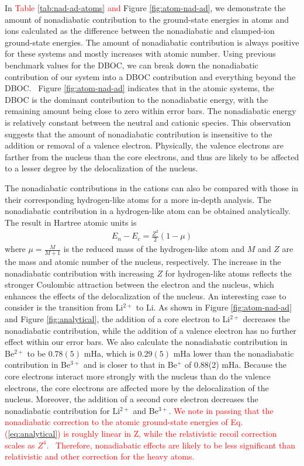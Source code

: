 \documentclass[aip,jcp,numerical,reprint]{revtex4-1}
\begin{document}
In \textcolor{red}{Table \ref{tab:nad-ad-atoms} and} Figure \ref{fig:atom-nad-ad}, we demonstrate the amount of nonadiabatic contribution to the ground-state energies in atoms and ions calculated as the difference between the nonadiabatic and clamped-ion ground-state energies. The amount of nonadiabatic contribution is always positive for these systems and mostly increases with atomic number. Using previous benchmark values for the DBOC, we can break down the nonadiabatic contribution of our system into a DBOC contribution and everything beyond the DBOC.~\cite{Klopper_DBOC,CFOUR,Harding} Figure \ref{fig:atom-nad-ad} indicates that in the atomic systems, the DBOC is the dominant contribution to the nonadiabatic energy, with the remaining amount being close to zero within error bars. The nonadiabatic energy is relatively constant between the neutral and cationic species. This observation suggests that the amount of nonadiabatic contribution is insensitive to the addition or removal of a valence electron. Physically, the valence electrons are farther from the nucleus than the core electrons, and thus are likely to be affected to a lesser degree by the delocalization of the nucleus. 

The nonadiabatic contributions in the cations can also be compared with those in their corresponding hydrogen-like atoms for a more in-depth analysis. The nonadiabatic contribution in a hydrogen-like atom can be obtained analytically. The result in Hartree atomic units is
\begin{align}
E_n-E_c=\frac{Z^2}{2}(1-\mu) \label{eq:analytical}
\end{align}
where $\mu=\frac{M}{M+1}$ is the reduced mass of the hydrogen-like atom and $M$ and $Z$ are the mass and atomic number of the nucleus, respectively. The increase in the nonadiabatic contribution with increasing $Z$ for hydrogen-like atoms reflects the stronger Coulombic attraction between the electron and the nucleus, which enhances the effects of the delocalization of the nucleus. An interesting case to consider is the transition from Li$^{2+}$ to Li. As shown in Figure \ref{fig:atom-nad-ad} and Figure \ref{fig:analytical}, the addition of a core electron to Li$^{2+}$ decreases the nonadiabatic contribution, while the addition of a valence electron has no further effect within our error bars. We also calculate the nonadiabatic contribution in Be$^{2+}$ to be $0.78(5)$ mHa, which is $0.29(5)$ mHa lower than the nonadiabatic contribution in Be$^{3+}$ and is closer to that in Be$^{+}$ of 0.88(2) mHa. Because the core electrons interact more strongly with the nucleus than do the valence electrons, the core electrons are affected more by the delocalization of the nucleus. Moreover, the addition of a second core electron decreases the nonadiabatic contribution for Li$^{2+}$ and Be$^{3+}$. %
\textcolor{red}{We note in passing that the nonadiabatic correction to the atomic ground-state energies of Eq. (\ref{eq:analytical}) is roughly linear in Z, while the relativistic recoil correction scales as $Z^4$.~\cite{Merkt_H2} Therefore, nonadiabatic effects are likely to be less significant than relativistic and other correction for the heavy atoms.}
\end{document}
